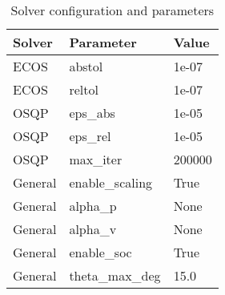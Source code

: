 \begin{table}[t]
\centering
\begin{tabular}{lll}
\toprule
Solver & Parameter & Value \\
\midrule
ECOS & abstol & 1e-07 \\
ECOS & reltol & 1e-07 \\
OSQP & eps_abs & 1e-05 \\
OSQP & eps_rel & 1e-05 \\
OSQP & max_iter & 200000 \\
General & enable_scaling & True \\
General & alpha_p & None \\
General & alpha_v & None \\
General & enable_soc & True \\
General & theta_max_deg & 15.0 \\
\bottomrule
\end{tabular}
\caption{Solver configuration and parameters}
\label{tab:solver_settings}
\end{table}
